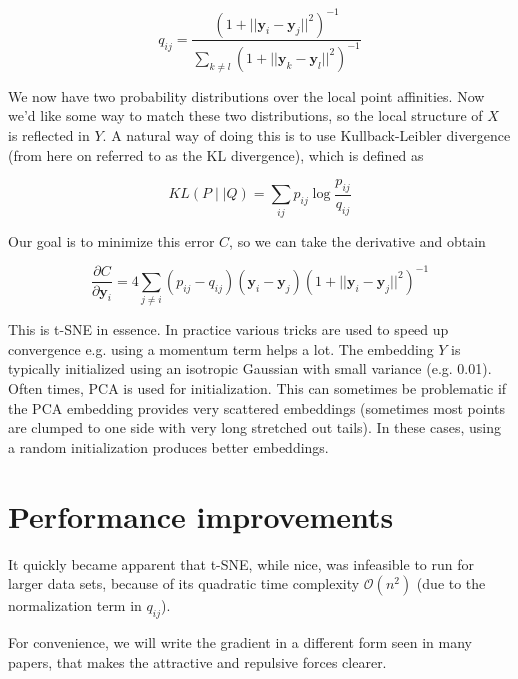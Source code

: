 \documentclass[11pt]{article}
\begin{document}
\begin{equation}
q_{ij} = \frac{\left ( 1 + || \mathbf{y}_i - \mathbf{y}_j ||^2 \right )^{-1}}{\sum_{k \neq l}\left ( 1 + || \mathbf{y}_k - \mathbf{y}_l ||^2 \right )^{-1}}
\end{equation}

We now have two probability distributions over the local point affinities. Now we'd like some way to match these two distributions, so the local structure of $X$ is reflected in $Y$. A natural way of doing this is to use Kullback-Leibler divergence (from here on referred to as the KL divergence), which is defined as

\begin{equation}
KL(P \mid \mid Q) = \sum_{ij} p_{ij} \log \frac{p_{ij}}{q_{ij}}
\end{equation}

Our goal is to minimize this error $C$, so we can take the derivative and obtain

\begin{equation}
\frac{\partial C}{\partial \mathbf{y}_i} = 4 \sum_{j \neq i} \left ( p_{ij} - q_{ij} \right ) \left ( \mathbf{y}_i - \mathbf{y}_j \right ) \left ( 1 + || \mathbf{y}_i - \mathbf{y}_j || ^2 \right )^{-1}
\end{equation}

This is t-SNE in essence. In practice various tricks are used to speed up convergence e.g. using a momentum term helps a lot. The embedding $Y$ is typically initialized using an isotropic Gaussian with small variance (e.g. 0.01). Often times, PCA is used for initialization. This can sometimes be problematic if the PCA embedding provides very scattered embeddings (sometimes most points are clumped to one side with very long stretched out tails). In these cases, using a random initialization produces better embeddings.

\section{Performance improvements}
It quickly became apparent that t-SNE, while nice, was infeasible to run for larger data sets, because of its quadratic time complexity $\mathcal{O}(n^2)$ (due to the normalization term in $q_{ij}$).

For convenience, we will write the gradient in a different form seen in many papers, that makes the attractive and repulsive forces clearer.
\end{document}
